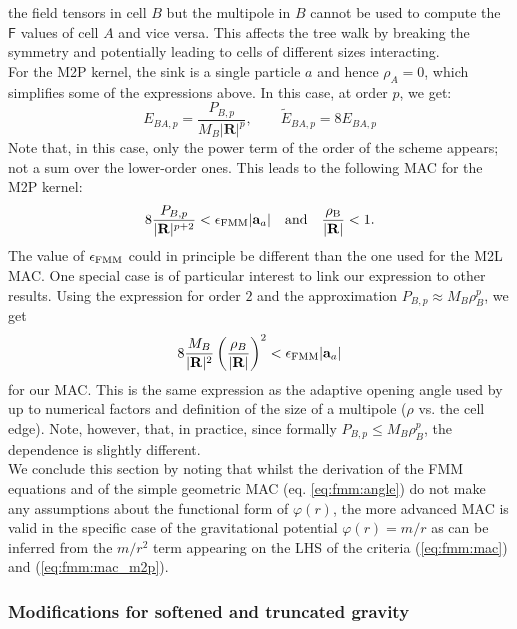 the field tensors in cell $B$ but the multipole in $B$ cannot be used
to compute the $\mathsf{F}$ values of cell $A$ and vice versa. This
affects the tree walk by breaking the symmetry and potentially leading
to cells of different sizes interacting. \\
For the M2P kernel, the sink is a single particle $a$ and hence
$\rho_A = 0$, which simplifies some of the expressions above. In this
case, at order $p$, we get:
\begin{equation}
  E_{BA,p} = \frac{P_{B,p}}{M_B |\mathbf{R}|^p}, \qquad
  \tilde{E}_{BA,p} = 8E_{BA,p} \nonumber
\end{equation}
Note that, in this case, only the power term of the order of the
scheme appears; not a sum over the lower-order ones. This leads to the
following MAC for the M2P kernel:
\begin{equation}
  8\frac{P_{B,p}}{|\mathbf{R}|^{p+2}} < \epsilon_{\rm FMM} |\mathbf{a}_a| \quad
  \rm{and} \quad \frac{\rho_B} {|\mathbf{R}|} < 1.
    \label{eq:fmm:mac_m2p}  
\end{equation}
The value of $\epsilon_{\rm FMM}$ could in principle be different than the one
used for the M2L MAC. One special case is of particular interest to
link our expression to other results. Using the expression for order
$2$ and the approximation $P_{B,p} \approx M_B \rho_B^p$, we
get
\begin{equation}
  8\frac{M_B}{|\mathbf{R}|^2}\left(\frac{\rho_B}{|\mathbf{R}|}\right)^2
  < \epsilon_{\rm FMM} |\mathbf{a}_a| \nonumber
\end{equation}
for our MAC.  This is the same expression as the adaptive opening
angle used by \gadget \cite[see eq.18 of][]{Springel2005} up to
numerical factors and definition of the size of a multipole ($\rho$
vs. the cell edge). Note, however, that, in practice, since formally
$P_{B,p} \leq M_B \rho_B^p$, the dependence is slightly
different.\\
We conclude this section by noting that whilst the derivation of the
FMM equations and of the simple geometric MAC (eq. \ref{eq:fmm:angle})
do not make any assumptions about the functional form of $\varphi(r)$,
the more advanced MAC is valid in the specific case of the
gravitational potential $\varphi(r) = m/r$ as can be inferred from the
$m/r^2$ term appearing on the LHS of the criteria (\ref{eq:fmm:mac})
and (\ref{eq:fmm:mac_m2p}).

\subsubsection{Modifications for softened and truncated gravity}

